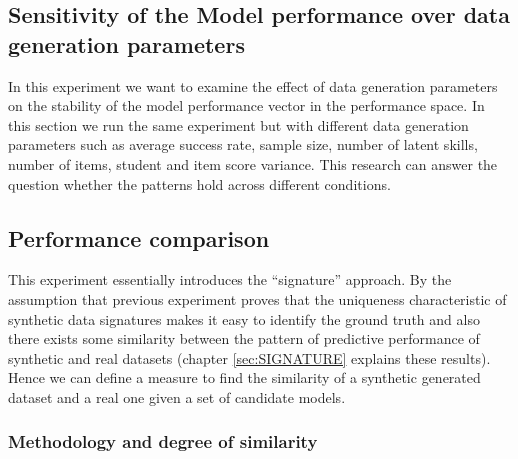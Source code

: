 
\subsection{Sensitivity of the Model performance over data generation parameters}
\label{Sensitive}

In this experiment we want to examine the effect of data generation parameters on the stability of the model performance vector in the performance space. In this section we run the same experiment but with different data generation parameters such as average success rate, sample size, number of latent skills, number of items, student and item score variance. This research can answer the question whether the patterns hold across different conditions.

\subsection{Performance comparison}


This experiment essentially introduces the ``signature'' approach. By the assumption that previous experiment proves that the uniqueness characteristic of synthetic data signatures makes it easy to identify the ground truth and also there exists some similarity between the pattern of predictive performance of synthetic and real datasets (chapter \ref{sec:SIGNATURE} explains these results). Hence we can define a measure to find the similarity of a synthetic generated dataset and a real one given a set of candidate models.

\subsubsection{Methodology and degree of similarity}


